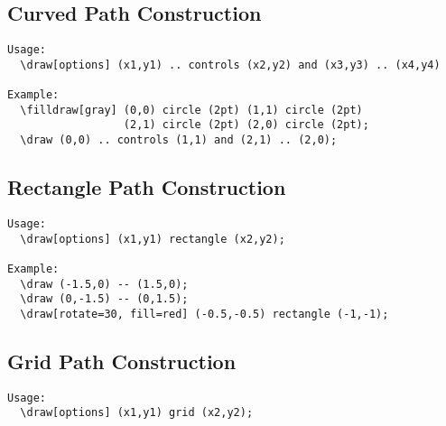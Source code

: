 \documentclass[a4paper,12pt]{article}
\begin{document}

\subsection{Curved Path Construction}
\begin{verbatim}
Usage:
  \draw[options] (x1,y1) .. controls (x2,y2) and (x3,y3) .. (x4,y4)

Example:
  \filldraw[gray] (0,0) circle (2pt) (1,1) circle (2pt)
                  (2,1) circle (2pt) (2,0) circle (2pt);
  \draw (0,0) .. controls (1,1) and (2,1) .. (2,0);
\end{verbatim}


\subsection{Rectangle Path Construction}
\begin{verbatim}
Usage:
  \draw[options] (x1,y1) rectangle (x2,y2);

Example:
  \draw (-1.5,0) -- (1.5,0);
  \draw (0,-1.5) -- (0,1.5);
  \draw[rotate=30, fill=red] (-0.5,-0.5) rectangle (-1,-1);
\end{verbatim}


\subsection{Grid Path Construction}
\begin{verbatim}
Usage:
  \draw[options] (x1,y1) grid (x2,y2); 
\end{verbatim}
\end{document}
